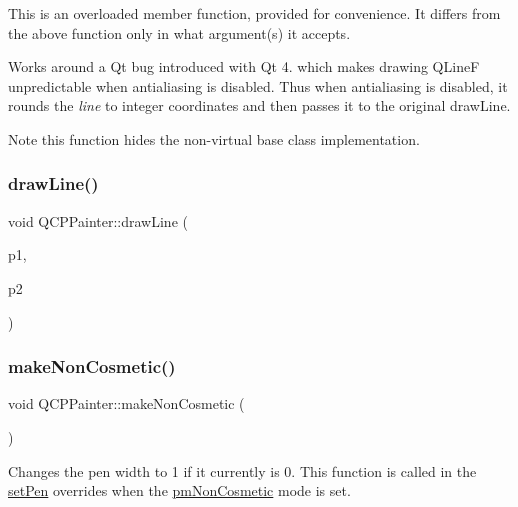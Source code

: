 This is an overloaded member function, provided for convenience. It differs from the above function only in what argument(s) it accepts.

Works around a Qt bug introduced with Qt 4. which makes drawing Q\+LineF unpredictable when antialiasing is disabled. Thus when antialiasing is disabled, it rounds the {\itshape line} to integer coordinates and then passes it to the original draw\+Line.

\begin{DoxyNote}{Note}
this function hides the non-\/virtual base class implementation. 
\end{DoxyNote}
\mbox{\label{class_q_c_p_painter_ad1638db27929491b3f1beb74d6cbad5e}} 
\subsubsection{\texorpdfstring{drawLine()}{drawLine()}\hspace{0.1cm}{\footnotesize\ttfamily [2/2]}}
{\footnotesize\ttfamily void Q\+C\+P\+Painter\+::draw\+Line (\begin{DoxyParamCaption}\item[{const Q\+PointF \&}]{p1,  }\item[{const Q\+PointF \&}]{p2 }\end{DoxyParamCaption})\hspace{0.3cm}{\ttfamily [inline]}}

\mbox{\label{class_q_c_p_painter_a7e63fbcf47e35c6f2ecd11b8fef7c7d8}} 
\subsubsection{\texorpdfstring{makeNonCosmetic()}{makeNonCosmetic()}}
{\footnotesize\ttfamily void Q\+C\+P\+Painter\+::make\+Non\+Cosmetic (\begin{DoxyParamCaption}{ }\end{DoxyParamCaption})}

Changes the pen width to 1 if it currently is 0. This function is called in the \mbox{\hyperlink{class_q_c_p_painter_af9c7a4cd1791403901f8c5b82a150195}{set\+Pen}} overrides when the \mbox{\hyperlink{class_q_c_p_painter_a156cf16444ff5e0d81a73c615fdb156dac1e481bfaf408f2bd2eaad3ec341f36b}{pm\+Non\+Cosmetic}} mode is set. \mbox{\label{class_q_c_p_painter_aef102658219b24165f7ee2aad1b9e48f}} 
